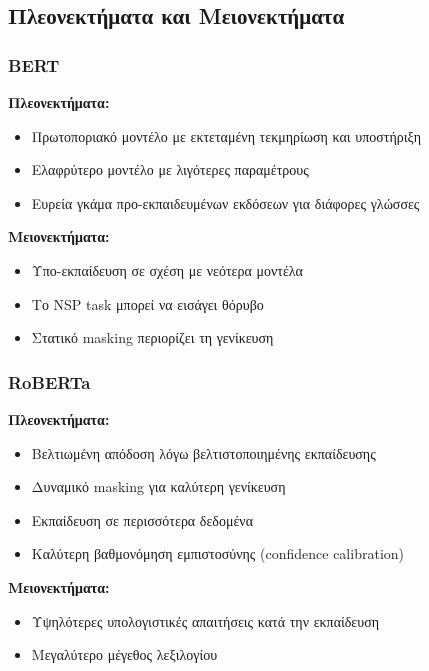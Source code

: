 \documentclass[a4paper,11pt,oneside,openany]{ioniothesis}
\begin{document}
\subsection{Πλεονεκτήματα και Μειονεκτήματα}
\label{sec:Πλεονεκτήματα και Μειονεκτήματα}

\subsubsection{BERT}
\label{sec:Πλεονεκτήματα Μειονεκτήματα BERT}

\textbf{Πλεονεκτήματα:}
\begin{itemize}
    \item Πρωτοποριακό μοντέλο με εκτεταμένη τεκμηρίωση και υποστήριξη
    \item Ελαφρύτερο μοντέλο με λιγότερες παραμέτρους
    \item Ευρεία γκάμα προ-εκπαιδευμένων εκδόσεων για διάφορες γλώσσες
\end{itemize}

\textbf{Μειονεκτήματα:}
\begin{itemize}
    \item Υπο-εκπαίδευση σε σχέση με νεότερα μοντέλα
    \item Το NSP task μπορεί να εισάγει θόρυβο
    \item Στατικό masking περιορίζει τη γενίκευση
\end{itemize}

\subsubsection{RoBERTa}
\label{sec:Πλεονεκτήματα Μειονεκτήματα RoBERTa}

\textbf{Πλεονεκτήματα:}
\begin{itemize}
    \item Βελτιωμένη απόδοση λόγω βελτιστοποιημένης εκπαίδευσης
    \item Δυναμικό masking για καλύτερη γενίκευση
    \item Εκπαίδευση σε περισσότερα δεδομένα
    \item Καλύτερη βαθμονόμηση εμπιστοσύνης (confidence calibration)
\end{itemize}

\textbf{Μειονεκτήματα:}
\begin{itemize}
    \item Υψηλότερες υπολογιστικές απαιτήσεις κατά την εκπαίδευση
    \item Μεγαλύτερο μέγεθος λεξιλογίου
\end{itemize}
\end{document}
